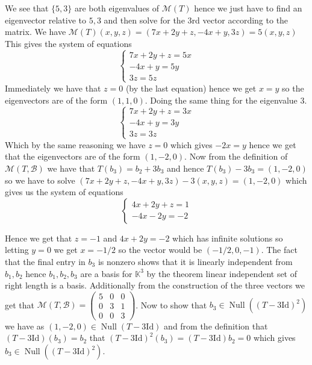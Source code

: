 \documentclass[letter,12pt]{article}
\newcommand{\K}{\mathbb{K}}
\newcommand{\Mat}{\mathcal{M}}
\newcommand{\Null}{\operatorname{Null}}
\begin{document}
We see that $\{5,3\}$ are both eigenvalues of $\Mat(T)$ hence we just have to find an eigenvector relative to $5,3$ and then solve for the $3$rd vector according to the matrix. We have $\Mat(T)(x,y,z)=(7x+2y+z,-4x+y, 3z)=5(x,y,z)$
This gives the system of equations 
\begin{equation*}
    \begin{cases}
        7x+2y+z=5x\\
        -4x+y=5y\\
        3z=5z
    \end{cases}    
\end{equation*}
Immediately we have that $z=0$ (by the last equation) hence we get $x=y$ so the eigenvectors are of the form $(1,1,0)$. Doing the same thing for the eigenvalue $3$. 
\begin{equation*}
    \begin{cases}
        7x+2y+z=3x\\
        -4x+y=3y\\
        3z=3z
    \end{cases}    
\end{equation*}
Which by the same reasoning we have $z=0$ which gives $-2x=y$ hence we get that the eigenvectors are of the form $(1,-2,0)$. Now from the definition of $\Mat (T,\mathcal B)$ we have that $T(b_3)=b_2+3b_3$ and hence $T(b_3)-3b_3=(1,-2,0)$ so we have to solve  $(7x+2y+z,-4x+y,3z)-3(x,y,z)=(1,-2,0)$ which gives us the system of equations
\begin{equation*}
    \begin{cases}
        4x+2y+z=1\\
        -4x-2y=-2
    \end{cases}
\end{equation*}

Hence we get that $z=-1$ and $4x+2y=-2$ which has infinite solutions so letting $y=0$ we get $x=-1/2$ so the vector would be $(-1/2,0,-1)$. The fact that the final entry in $b_3$ is nonzero shows that it is linearly independent from $b_1,b_2$ hence $b_1,b_2,b_3$ are a basis for $\K^3$ by the theorem linear independent set of right length is a basis. Additionally from the construction of the three vectors we get that $\Mat(T,\mathcal{B})=\begin{pmatrix}
    5 & 0 & 0 \\ 
    0&3&1\\
    0&0&3
\end{pmatrix}$. Now to show that $b_3\in \Null((T-3\text{Id})^2)$ we have as $(1,-2,0)\in \Null(T-3\text{Id})$ and from the definition that $(T-3\text{Id})(b_3)=b_2$ that $(T-3\text{Id})^2(b_3)=(T-3\text{Id})b_2=0$ which gives $b_3\in \Null ((T-3\text{Id})^2)$. 
\end{document}
